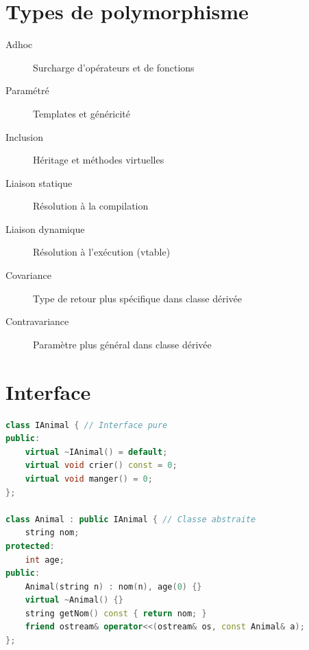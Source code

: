 \documentclass{article}
\begin{document}
\begin{multicols*}{3}
\section*{Types de polymorphisme}
\begin{description}
\item[Adhoc] Surcharge d'opérateurs et de fonctions
\item[Paramétré] Templates et généricité
\item[Inclusion] Héritage et méthodes virtuelles
\item[Liaison statique] Résolution à la compilation
\item[Liaison dynamique] Résolution à l'exécution (vtable)
\item[Covariance] Type de retour plus spécifique dans classe dérivée
\item[Contravariance] Paramètre plus général dans classe dérivée
\end{description}

\section*{Interface}
\begin{lstlisting}[language=C++]
class IAnimal { // Interface pure
public:
    virtual ~IAnimal() = default;
    virtual void crier() const = 0;
    virtual void manger() = 0;
};

class Animal : public IAnimal { // Classe abstraite
    string nom;
protected:
    int age;
public:
    Animal(string n) : nom(n), age(0) {}
    virtual ~Animal() {}
    string getNom() const { return nom; }
    friend ostream& operator<<(ostream& os, const Animal& a);
};
\end{lstlisting}



\end{multicols*}
\end{document}
